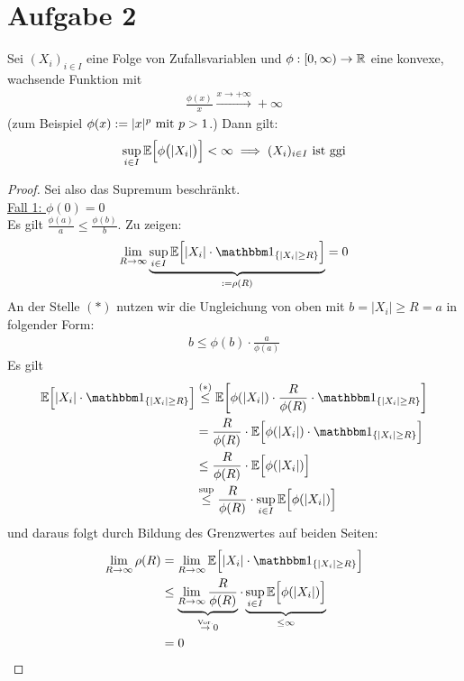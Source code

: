 \documentclass[12pt,a4paper]{article}
\begin{document}
\section*{Aufgabe 2}
Sei $(X_i)_{i\in I}$ eine Folge von Zufallsvariablen und $\phi:[0,\infty)\to\R$ eine konvexe, wachsende Funktion mit 
\begin{align*}
\frac{\phi(x)}{x}\stackrel{x\to+\infty}{\longrightarrow}+\infty
\end{align*}
(zum Beispiel $\phi(x):=|x|^p\mit p>1$.) Dann gilt:
\begin{align*}
\sup\limits_{i\in I}\E\Big[\phi\big(|X_i|\big)\Big]<\infty\implies(X_i)_{i\in I}\text{ ist ggi}
\end{align*}
\begin{proof}
Sei also das Supremum beschränkt.\\

\underline{Fall 1: $\phi(0)=0$}\\
Es gilt $\frac{\phi(a)}{a}\leq\frac{\phi(b)}{b}$.
Zu zeigen:
\begin{align*}
\lim\limits_{R\to\infty}\underbrace{\sup\limits_{i\in I}
\E\Big[|X_i|\cdot\indi_{\lbrace |X_i|\geq R\rbrace}\Big]}_{:=\rho(R)}=0
\end{align*}
An der Stelle $(\ast)$ nutzen wir die Ungleichung von oben mit $b = |X_i| \geq R = a$ in folgender Form:
\begin{align*}
	b \leq \phi(b) \cdot \frac{a}{\phi(a)}
\end{align*}
Es gilt
\begin{align*}
\E\Big[|X_i|\cdot\indi_{\lbrace |X_i|\geq R\rbrace}\Big]
&\stackrel{(\ast)}{\leq}
\E\bigg[\phi(|X_i|)\cdot\frac{R}{\phi(R)}\cdot\indi_{\lbrace |X_i|\geq R\rbrace}\bigg]\\
&=\frac{R}{\phi(R)}\cdot\E\Big[\phi(|X_i|)\cdot\indi_{\lbrace |X_i|\geq R\rbrace}\Big]\\
&\leq\frac{R}{\phi(R)}\cdot\E\Big[\phi(|X_i|)\Big]\\
&\stackrel{\text{sup}}{\leq}
\frac{R}{\phi(R)}\cdot\sup_{i\in I}\E\Big[\phi(|X_i|)\Big]\\
\end{align*}
und daraus folgt durch Bildung des Grenzwertes auf beiden Seiten:
\begin{align*}
	\lim\limits_{R\rightarrow \infty}\rho(R)
	&=\lim\limits_{R\rightarrow \infty} \E\Big[|X_i|\cdot\indi_{\lbrace |X_i|\geq R\rbrace}\Big] \\
	&\leq 
	\underbrace{\lim\limits_{R\rightarrow \infty}\frac{R}{\phi(R)}}_{\stackrel{\text{Vor.}}{\rightarrow} 0}\cdot\underbrace{\sup_{i\in I}\E\Big[\phi(|X_i|)\Big]}_{\leq \infty}\\
	&=0
\end{align*}


\end{proof}
\end{document}
